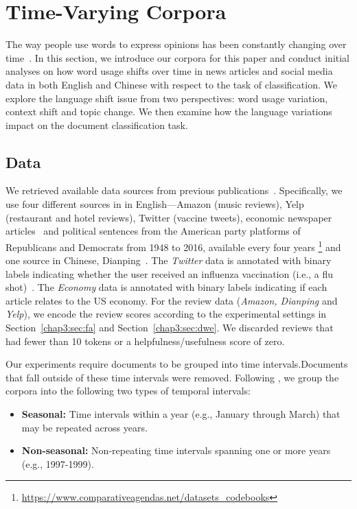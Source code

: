 \section{Time-Varying Corpora}
\label{chap3:sec:data}

The way people use words to express opinions has been constantly changing over time~\cite{mihalcea2012word, kulkarni2015statistically, hamilton2016diachronic}. In this section, we introduce our corpora for this paper and conduct initial analyses on how word usage shifts over time in news articles and social media data in both English and Chinese with respect to the task of classification. We explore the language shift issue from two perspectives: word usage variation, context shift and topic change. We then examine how the language variations impact on the document classification task.

\subsection{Data}
We retrieved available data sources from previous publications~\cite{zhang2014explicit, he2016ups, huang2018examining}. Specifically, we use four different sources in in English---Amazon (music reviews), Yelp (restaurant and hotel reviews), Twitter (vaccine tweets), economic newspaper articles~\cite{figure_eight_2015} and political sentences from the American party platforms of Republicans and Democrats from 1948 to 2016, available every four years \footnote{\url{https://www.comparativeagendas.net/datasets_codebooks}} and one source in Chinese, Dianping~\cite{meituan-dianping_2019}.
The \textit{Twitter} data is annotated with binary labels indicating whether the user received an influenza vaccination (i.e., a flu shot)~\cite{huang2017examining}.
The \textit{Economy} data is annotated with binary labels indicating if each article relates to the US economy. 
For the review data (\textit{Amazon, Dianping} and \textit{Yelp}), we encode the review scores according to the experimental settings in Section~\ref{chap3:sec:fa} and Section~\ref{chap3:sec:dwe}. We discarded reviews that had fewer than 10 tokens or a helpfulness/usefulness score of zero. 

Our experiments require documents to be grouped into time intervals.Documents that fall outside of these time intervals were removed. Following \cite{huang2018examining}, we group the corpora into the following two types of temporal intervals:

\begin{itemize}[leftmargin=*,itemsep=0ex]
\item {\bf Seasonal:} Time intervals within a year (e.g., January through March) that may be repeated across years.
\item {\bf Non-seasonal:} Non-repeating time intervals spanning one or more years (e.g., 1997-1999).
\end{itemize}

